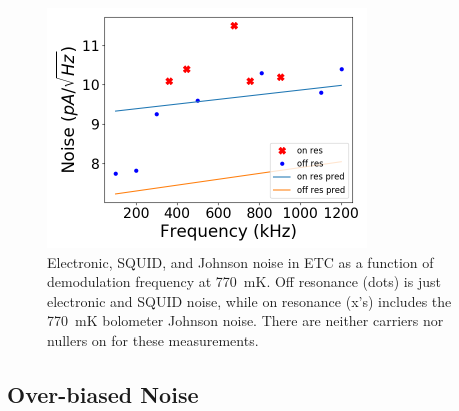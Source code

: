 \begin{figure}[ht!]
\begin{center}
\includegraphics[height=2.5in]{figures/squid_noise_770mK.png}
\caption{Electronic, \ac{SQUID}, and Johnson noise in \ac{ETC} as a function of demodulation frequency at 770~mK. Off resonance (dots) is just electronic and \ac{SQUID} noise, while on resonance (x's) includes the 770~mK bolometer Johnson noise. There are neither carriers nor nullers on for these measurements. 
\label{fig:770mK_squid_noise} }
\end{center}
\end{figure}










\subsection{Over-biased Noise}
\label{sec:over_biased_noise}

